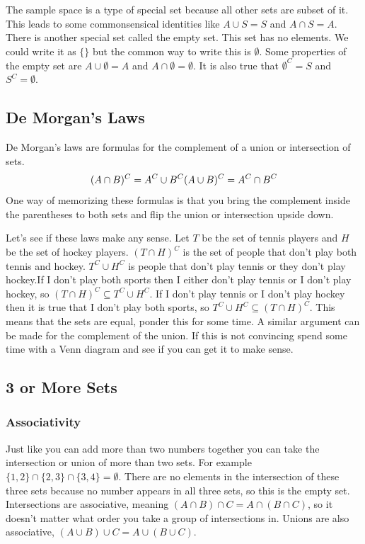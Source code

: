 \documentclass[]{book}
\begin{document}
The sample space is a type of special set because all other sets are
subset of it. This leads to some commonsensical identities like
\(A \cup S = S\) and \(A \cap S = A\). There is another special set
called the empty set. This set has no elements. We could write it as
\(\{\}\) but the common way to write this is \(\emptyset\). Some
properties of the empty set are \(A \cup \emptyset = A\) and
\(A \cap \emptyset = \emptyset\). It is also true that
\(\emptyset^C = S\) and \(S^C = \emptyset\).

\subsection{De Morgan's Laws}\label{de-morgans-laws}

De Morgan's laws are formulas for the complement of a union or
intersection of sets. \[(A \cap B)^C = A^C \cup B^C \\
 (A \cup B)^C = A^C \cap B^C\] One way of memorizing these formulas is
that you bring the complement inside the parentheses to both sets and
flip the union or intersection upside down.

Let's see if these laws make any sense. Let \(T\) be the set of tennis
players and \(H\) be the set of hockey players. \((T \cap H)^C\) is the
set of people that don't play both tennis and hockey. \(T^C \cup H^C\)
is people that don't play tennis or they don't play hockey.If I don't
play both sports then I either don't play tennis or I don't play hockey,
so \((T \cap H)^C \subseteq T^C \cup H^C\). If I don't play tennis or I
don't play hockey then it is true that I don't play both sports, so
\(T^C \cup H^C \subseteq (T \cap H)^C\). This means that the sets are
equal, ponder this for some time. A similar argument can be made for the
complement of the union. If this is not convincing spend some time with
a Venn diagram and see if you can get it to make sense.

\subsection{3 or More Sets}\label{or-more-sets}

\subsubsection{Associativity}\label{associativity}

Just like you can add more than two numbers together you can take the
intersection or union of more than two sets. For example
\(\{1,2\} \cap \{2,3\} \cap \{3,4\} = \emptyset\). There are no elements
in the intersection of these three sets because no number appears in all
three sets, so this is the empty set. Intersections are associative,
meaning \((A \cap B) \cap C= A \cap (B \cap C)\), so it doesn't matter
what order you take a group of intersections in. Unions are also
associative, \((A \cup B) \cup C= A \cup (B \cup C)\).
\end{document}

